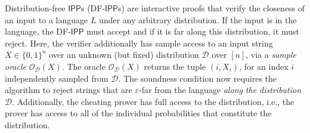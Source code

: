 \documentclass[10pt,a4paper]{article}
\newcommand{\IPP}{\mathsf{IPP}}
\begin{document}
Distribution-free $\IPP$s (DF-$\IPP$s) are interactive proofs that verify the closeness of an input to a language $L$ under any arbitrary distribution. If the input is in the language, the DF-$\IPP$ must accept and if it is far along this distribution, it must reject. Here, the verifier additionally has sample access to an input string $X\in \{0,1\}^{n}$ over an unknown (but fixed) distribution $\mathcal{D}$ over $[n]$, via a \textit{sample oracle} $\mathcal{O}_\mathcal{D}(X)$. The oracle $\mathcal{O}_\mathcal{D}(X)$ returns the tuple $(i,X_i)$, for an index $i$ independently sampled from $\mathcal{D}$. The soundness condition now requires the algorithm to reject strings that are $\varepsilon$-far from the language \emph{along the distribution $\mathcal{D}$}. Additionally, the cheating prover has full access to the distribution, i.e., the prover has access to all of the individual probabilities that constitute the distribution.
 
\end{document}
